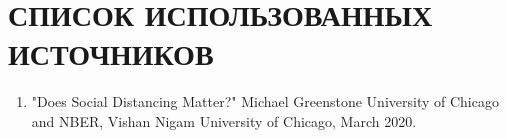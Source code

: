 \chapter*{СПИСОК ИСПОЛЬЗОВАННЫХ ИСТОЧНИКОВ}

\begin{enumerate}



    
    
    
            
    
    
    \item "Does Social Distancing Matter?" Michael Greenstone University of Chicago and NBER, Vishan Nigam University of Chicago, March 2020.
        

\end{enumerate}

